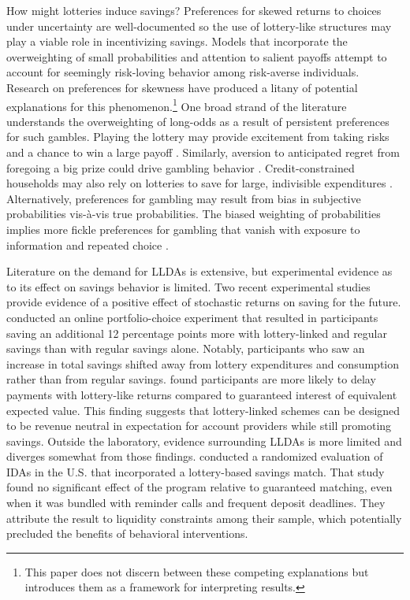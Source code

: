 \documentclass[12pt]{article}
\begin{document}
	How might lotteries induce savings? Preferences for skewed returns to choices under uncertainty are well-documented so the use of lottery-like structures may play a viable role in incentivizing savings. Models that incorporate the overweighting of small probabilities  and attention to salient payoffs  attempt to account for seemingly risk-loving behavior among risk-averse individuals. Research on preferences for skewness have produced a litany of potential explanations for this phenomenon.\footnote{This paper does not discern between these competing explanations but introduces them as a framework for interpreting results.} One broad strand of the literature understands the overweighting of long-odds as a result of persistent preferences for such gambles. Playing the lottery may provide excitement from taking risks and a chance to win a large payoff . Similarly, aversion to anticipated regret from foregoing a big prize could drive gambling behavior . Credit-constrained households may also rely on lotteries to save for large, indivisible expenditures . Alternatively, preferences for gambling may result from bias in subjective probabilities vis-\`{a}-vis true probabilities. The biased weighting of probabilities implies more fickle preferences for gambling that vanish with exposure to information and repeated choice .


	Literature on the demand for LLDAs is extensive, but experimental evidence as to its effect on savings behavior is limited. Two recent experimental studies provide evidence of a positive effect of stochastic returns on saving for the future.  conducted an online portfolio-choice experiment that resulted in participants saving an additional 12 percentage points more with lottery-linked and regular savings than with regular savings alone. Notably, participants who saw an increase in total savings shifted away from lottery expenditures and consumption rather than from regular savings.  found participants are more likely to delay payments with lottery-like returns compared to guaranteed interest of equivalent expected value. This finding suggests that lottery-linked schemes can be designed to be revenue neutral in expectation for account providers while still promoting savings. Outside the laboratory, evidence surrounding LLDAs is more limited and diverges somewhat from those findings.  conducted a randomized evaluation of IDAs in the U.S. that incorporated a lottery-based savings match. That study found no significant effect of the program relative to guaranteed matching, even when it was bundled with reminder calls and frequent deposit deadlines. They attribute the result to liquidity constraints among their sample, which potentially precluded the benefits of behavioral interventions.
\end{document}
